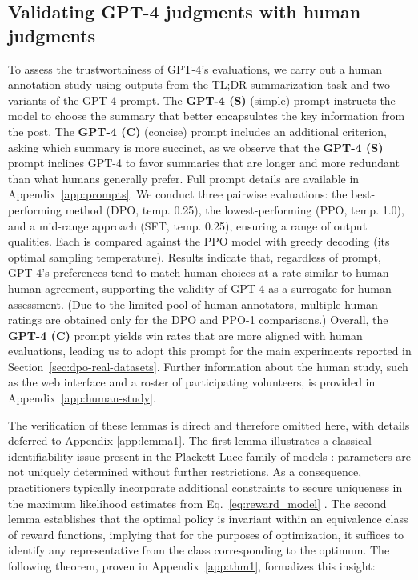 \subsection{Validating GPT-4 judgments with human judgments}
\label{sec:human-judgments}
To assess the trustworthiness of GPT-4's evaluations, we carry out a human annotation study using outputs from the TL;DR summarization task and two variants of the GPT-4 prompt. The \textbf{GPT-4 (S)} (simple) prompt instructs the model to choose the summary that better encapsulates the key information from the post. The \textbf{GPT-4 (C)} (concise) prompt includes an additional criterion, asking which summary is more succinct, as we observe that the \textbf{GPT-4 (S)} prompt inclines GPT-4 to favor summaries that are longer and more redundant than what humans generally prefer. Full prompt details are available in Appendix~\ref{app:prompts}. We conduct three pairwise evaluations: the best-performing method (DPO, temp. 0.25), the lowest-performing (PPO, temp. 1.0), and a mid-range approach (SFT, temp. 0.25), ensuring a range of output qualities. Each is compared against the PPO model with greedy decoding (its optimal sampling temperature). Results indicate that, regardless of prompt, GPT-4's preferences tend to match human choices at a rate similar to human-human agreement, supporting the validity of GPT-4 as a surrogate for human assessment. (Due to the limited pool of human annotators, multiple human ratings are obtained only for the DPO and PPO-1 comparisons.) Overall, the \textbf{GPT-4 (C)} prompt yields win rates that are more aligned with human evaluations, leading us to adopt this prompt for the main experiments reported in Section~\ref{sec:dpo-real-datasets}. Further information about the human study, such as the web interface and a roster of participating volunteers, is provided in Appendix~\ref{app:human-study}.

\label{sec:theory}

The verification of these lemmas is direct and therefore omitted here, with details deferred to Appendix \ref{app:lemma1}. The first lemma illustrates a classical identifiability issue present in the Plackett-Luce family of models \cite{plackett1975analysis}: parameters are not uniquely determined without further restrictions. As a consequence, practitioners typically incorporate additional constraints to secure uniqueness in the maximum likelihood estimates from Eq.~\ref{eq:reward_model} \cite{bong2022generalized}. The second lemma establishes that the optimal policy is invariant within an equivalence class of reward functions, implying that for the purposes of optimization, it suffices to identify any representative from the class corresponding to the optimum. The following theorem, proven in Appendix~\ref{app:thm1}, formalizes this insight:

